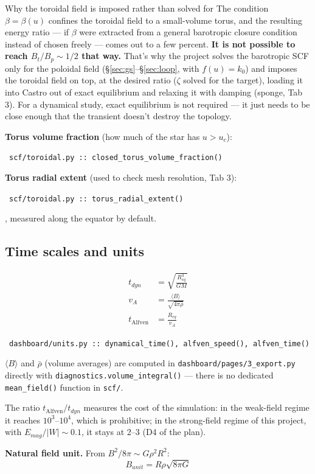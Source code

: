 \documentclass[11pt,a4paper]{scrartcl}
\newcommand{\arrowto}[1]{%
  \par\vspace{2pt}\noindent{\color{linkblue}$\rightarrow$}~\texttt{\small #1}\par\vspace{2pt}}
\newcommand{\code}[1]{\texttt{\small #1}}
\begin{document}
\begin{whybox}{Why the toroidal field is imposed rather than solved for}
The condition $\beta=\beta(u)$ confines the toroidal field to a
small-volume torus, and the resulting energy ratio --- if $\beta$ were
extracted from a general barotropic closure condition instead of chosen
freely --- comes out to a few percent. \textbf{It is not possible to
reach $B_t/B_p\sim1/2$ that way.} That's why the project solves the
barotropic SCF only for the poloidal field (\S\ref{sec:gs}--\S\ref{sec:loop},
with $f(u)=k_0$) and imposes the toroidal field on top, at the desired
ratio ($\zeta$ solved for the target), loading it into Castro out of
exact equilibrium and relaxing it with damping (sponge, Tab 3). For a
dynamical study, exact equilibrium is not required --- it just needs to
be close enough that the transient doesn't destroy the topology.
\end{whybox}

\textbf{Torus volume fraction} (how much of the star has $u>u_c$):
\arrowto{scf/toroidal.py :: closed\_torus\_volume\_fraction()}

\textbf{Torus radial extent} (used to check mesh resolution, Tab 3):
\arrowto{scf/toroidal.py :: torus\_radial\_extent()}, measured along the equator by default.

\subsection{Time scales and units}

\begin{align}
t_{dyn} &= \sqrt{\frac{R_{eq}^3}{GM}}\\
v_A &= \frac{\langle B\rangle}{\sqrt{4\pi\bar\rho}}\\
t_{\text{Alfven}} &= \frac{R_{eq}}{v_A}
\end{align}

\arrowto{dashboard/units.py :: dynamical\_time(), alfven\_speed(), alfven\_time()} $\langle B\rangle$ and $\bar\rho$ (volume averages) are computed in \code{dashboard/pages/3\_export.py} directly with \code{diagnostics.volume\_integral()} --- there is no dedicated \code{mean\_field()} function in \code{scf/}.

The ratio $t_{\text{Alfven}}/t_{dyn}$ measures the cost of the
simulation: in the weak-field regime it reaches $10^3$--$10^4$, which is
prohibitive; in the strong-field regime of this project, with
$E_{mag}/|W|\sim0.1$, it stays at 2--3 (D4 of the plan).

\textbf{Natural field unit.} From $B^2/8\pi\sim G\rho^2R^2$:
\begin{equation}
B_{unit} = R\rho\sqrt{8\pi G}
\end{equation}
\end{document}
